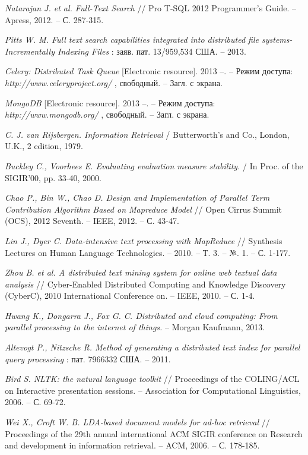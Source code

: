 \documentclass[12pt]{report}
\begin{document}
\begin{thebibliography}{99}
{\it Natarajan J. et al. Full-Text Search} // Pro T-SQL 2012 Programmer’s Guide. -- Apress, 2012. -- С. 287-315.

{\it  Pitts W. M. Full text search capabilities integrated into distributed file systems-Incrementally Indexing Files} : заяв. пат. 13/959,534 США. – 2013.

{\it  Celery: Distributed Task Queue } [Electronic resource]. 2013 --. -- Режим доступа: {\it
  http://www.celeryproject.org/ }, свободный. -- Загл. с экрана.

{\it  MongoDB  } [Electronic resource]. 2013 --. -- Режим доступа: {\it
  http://www.mongodb.org/ }, свободный. -- Загл. с экрана.


{\it  C. J. van Rijsbergen. Information Retrieval } / Butterworth's and Co., London, U.K., 2 edition, 1979.


{\it  Buckley C., Voorhees E. Evaluating evaluation measure stability. } /  In Proc. of the SIGIR'00, pp. 33-40, 2000. 


{\it Chao P., Bin W., Chao D. Design and Implementation of Parallel Term Contribution Algorithm Based on Mapreduce Model} // Open Cirrus Summit (OCS), 2012 Seventh. -- IEEE, 2012. -- С. 43-47.

{\it Lin J., Dyer C. Data-intensive text processing with MapReduce} // Synthesis Lectures on Human Language Technologies. -- 2010. -- Т. 3. -- №. 1. -- С. 1-177.

{\it Zhou B. et al. A distributed text mining system for online web textual data analysis} // Cyber-Enabled Distributed Computing and Knowledge Discovery (CyberC), 2010 International Conference on. -- IEEE, 2010. -- С. 1-4.

{\it Hwang K., Dongarra J., Fox G. C. Distributed and cloud computing: From parallel processing to the internet of things.} -- Morgan Kaufmann, 2013.

{\it Altevogt P., Nitzsche R. Method of generating a distributed text index for parallel query processing }: пат. 7966332 США. -- 2011.

{\it Bird S. NLTK: the natural language toolkit } // Proceedings of the COLING/ACL on Interactive presentation sessions. -- Association for Computational Linguistics, 2006. -- С. 69-72.

{\it Wei X., Croft W. B. LDA-based document models for ad-hoc retrieval} // Proceedings of the 29th annual international ACM SIGIR conference on Research and development in information retrieval. -- ACM, 2006. -- С. 178-185.


\end{thebibliography}

\end{document}
